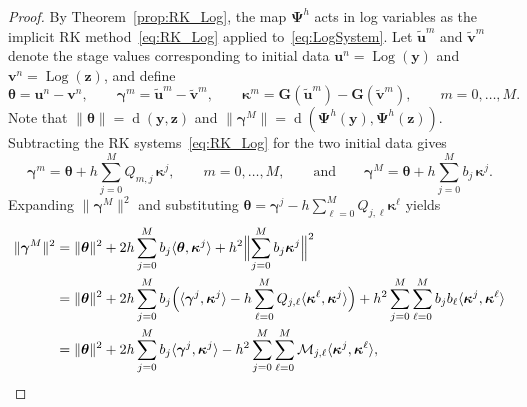 \documentclass[10pt,a4paper]{amsart}
\begin{document}
\begin{proof}
    By Theorem~\ref{prop:RK_Log}, the map $\bm{\Psi}^h$ 
    acts in log variables as the implicit RK 
    method~\eqref{eq:RK_Log} applied 
    to~\eqref{eq:LogSystem}. Let $\tilde{\bm{u}}^m$ and 
    $\tilde{\bm{v}}^m$ denote the stage values 
    corresponding to initial data 
    $\bm{u}^n=\operatorname{Log}(\bm{y})$ and 
    $\bm{v}^n=\operatorname{Log}(\bm{z})$, and define
    \[
        \bm{\theta} = \bm{u}^n - \bm{v}^n,
        \qquad
        \bm{\gamma}^m = \tilde{\bm{u}}^m 
                        - \tilde{\bm{v}}^m,
        \qquad
        \bm{\kappa}^m = \bm{G}(\tilde{\bm{u}}^m)
                        - \bm{G}(\tilde{\bm{v}}^m),
        \qquad m=0,\dots,M.
    \]
    Note that $\|\bm{\theta}\|
    = \operatorname{d}(\bm{y},\bm{z})$ and 
    $\|\bm{\gamma}^M\|
    = \operatorname{d}(\bm{\Psi}^h(\bm{y}),
                      \bm{\Psi}^h(\bm{z}))$.
    Subtracting the RK systems~\eqref{eq:RK_Log} for 
    the two initial data gives
    \[
        \bm{\gamma}^m 
        = \bm{\theta} 
          + h\sum_{j=0}^M Q_{m,j}\,\bm{\kappa}^j,
        \qquad m=0,\dots,M,
        \qquad\text{and}\qquad
        \bm{\gamma}^M 
        = \bm{\theta} 
          + h\sum_{j=0}^M b_j\,\bm{\kappa}^j.
    \]
    Expanding $\|\bm{\gamma}^M\|^2$ and substituting 
    $\bm{\theta} = \bm{\gamma}^j 
    - h\sum_{\ell=0}^M Q_{j,\ell}\bm{\kappa}^\ell$ yields
    \begin{equation}\label{eq:NormExpansion}
        \begin{split}
        \|\bm{\gamma}^M\|^2
        &= \|\bm{\theta}\|^2
           + 2h\sum_{j=0}^M b_j
             \langle\bm{\theta},\bm{\kappa}^j\rangle
           + h^2\Bigl\|\sum_{j=0}^M 
             b_j\bm{\kappa}^j\Bigr\|^2 \\
        &= \|\bm{\theta}\|^2
           + 2h\sum_{j=0}^M b_j
             \Bigl(\langle\bm{\gamma}^j,\bm{\kappa}^j\rangle
             - h\sum_{\ell=0}^M Q_{j,\ell}
               \langle\bm{\kappa}^\ell,
                       \bm{\kappa}^j\rangle\Bigr)
           + h^2\sum_{j=0}^M\sum_{\ell=0}^M
             b_j b_\ell
             \langle\bm{\kappa}^j,\bm{\kappa}^\ell
             \rangle \\
        &= \|\bm{\theta}\|^2
           + 2h\sum_{j=0}^M b_j
             \langle\bm{\gamma}^j,\bm{\kappa}^j\rangle
           - h^2\sum_{j=0}^M\sum_{\ell=0}^M
             \mathcal{M}_{j,\ell}
             \langle\bm{\kappa}^j,
                     \bm{\kappa}^\ell\rangle,
        \end{split}
    \end{equation}

\end{proof}
\end{document}
